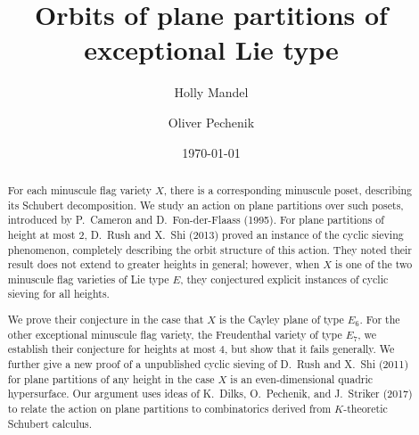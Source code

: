 \documentclass[12pt]{amsart}
\theoremstyle{definition}
\theoremstyle{remark}
\numberwithin{equation}{section}
\begin{document}

\title[Orbits of plane partitions]{Orbits of plane partitions of exceptional Lie type}  

\author[H. Mandel]{Holly Mandel}
\address[HM]{Department of Mathematics, University of California, Berkeley, \linebreak Berkeley, CA 94720}

\author[O. Pechenik]{Oliver Pechenik}
\address[OP]{Department of Mathematics, University of Michigan, Ann Arbor, MI 48109}


\date{\today}




\begin{abstract}
For each minuscule flag variety $X$, there is a corresponding minuscule poset, describing its Schubert decomposition. We study an action on plane partitions over such posets, introduced by P.~Cameron and D.~Fon-der-Flaass (1995).
For plane partitions of height at most $2$, D.~Rush and X.~Shi (2013) proved an instance of the cyclic sieving phenomenon, completely describing the orbit structure of this action. They noted their result does not extend to greater heights in general; however, when $X$ is one of the two minuscule flag varieties of Lie type $E$, they conjectured explicit instances of cyclic sieving for all heights.

We prove their conjecture in the case that $X$ is the Cayley plane of type $E_6$. For the other exceptional minuscule flag variety, the Freudenthal variety of type $E_7$, we establish their conjecture for heights at most $4$, but show that it fails generally. We further give a new proof of a unpublished cyclic sieving of D.~Rush and X.~Shi (2011) for plane partitions of any height in the case $X$ is an even-dimensional quadric hypersurface. 
Our argument uses ideas of K.~Dilks, O.~Pechenik, and J.~Striker (2017) to relate the action on plane partitions to combinatorics derived from $K$-theoretic Schubert calculus. 
\end{abstract}
\end{document}
